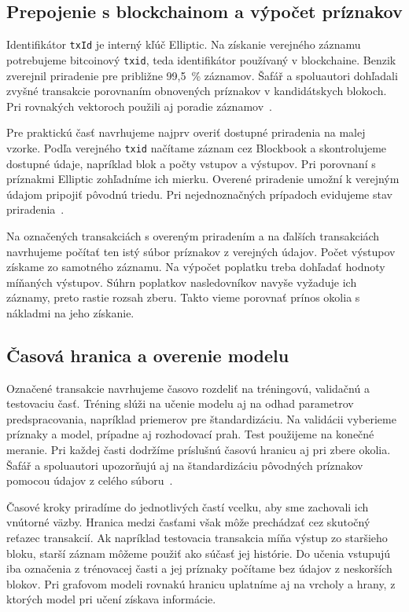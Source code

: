 \subsection{Prepojenie s blockchainom a výpočet príznakov}

Identifikátor \texttt{txId} je interný kľúč Elliptic. Na získanie
verejného záznamu potrebujeme bitcoinový \texttt{txid}, teda
identifikátor používaný v blockchaine. Benzik zverejnil
priradenie pre približne 99,5~\% záznamov. Šafář a spoluautori
dohľadali zvyšné transakcie porovnaním obnovených príznakov
v kandidátskych blokoch. Pri rovnakých vektoroch použili aj
poradie záznamov~\cite{ellipticMapping,safar2026elliptic}.

Pre praktickú časť navrhujeme najprv overiť dostupné priradenia
na malej vzorke. Podľa verejného \texttt{txid} načítame záznam
cez Blockbook a skontrolujeme dostupné údaje, napríklad blok
a počty vstupov a výstupov. Pri porovnaní s príznakmi Elliptic
zohľadníme ich mierku. Overené priradenie umožní k verejným
údajom pripojiť pôvodnú triedu. Pri nejednoznačných prípadoch
evidujeme stav priradenia~\cite{trezorBlockbook,safar2026elliptic}.

Na označených transakciách s overeným priradením a na ďalších
transakciách navrhujeme počítať ten istý súbor príznakov z verejných
údajov. Počet výstupov získame zo samotného záznamu. Na výpočet
poplatku treba dohľadať hodnoty míňaných výstupov. Súhrn poplatkov
nasledovníkov navyše vyžaduje ich záznamy, preto rastie rozsah zberu.
Takto vieme porovnať prínos okolia s nákladmi na jeho získanie.

\subsection{Časová hranica a overenie modelu}
\label{sec:elliptic-evaluation}

Označené transakcie navrhujeme časovo rozdeliť na tréningovú,
validačnú a testovaciu časť. Tréning slúži na učenie modelu aj
na odhad parametrov predspracovania, napríklad priemerov pre
štandardizáciu. Na validácii vyberieme príznaky a model, prípadne
aj rozhodovací prah. Test použijeme na konečné meranie. Pri
každej časti dodržíme príslušnú časovú hranicu aj pri zbere okolia.
Šafář a spoluautori upozorňujú aj na štandardizáciu pôvodných
príznakov pomocou údajov z celého súboru~\cite{safar2026elliptic}.

Časové kroky priradíme do jednotlivých častí vcelku, aby sme
zachovali ich vnútorné väzby. Hranica medzi časťami však môže
prechádzať cez skutočný reťazec transakcií. Ak napríklad testovacia
transakcia míňa výstup zo staršieho bloku, starší záznam môžeme
použiť ako súčasť jej histórie. Do učenia vstupujú iba označenia
z trénovacej časti a jej príznaky počítame bez údajov z neskorších
blokov. Pri grafovom modeli rovnakú hranicu uplatníme aj na vrcholy
a hrany, z ktorých model pri učení získava informácie.


